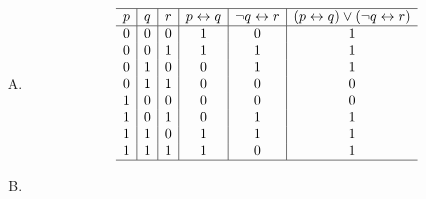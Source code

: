 {{\begin{practices}
\begin{enumerate}[A.]
{\begin{table}[H]
\[\begin{array}{c|c|c|c|c|c}
                                0 & 1 & 0 & 1 & 0 & 0 \\
                                0 & 1 & 1 & 1 & 1 & 1 \\
                                1 & 0 & 0 & 0 & 1 & 0 \\
                                1 & 0 & 1 & 0 & 1 & 0 \\
                                1 & 1 & 0 & 1 & 1 & 1 \\
                                1 & 1 & 1 & 1 & 1 & 1 \\
                                \hline
                            \end{array}
                        \]
                    \end{table}
                }
                \item
                {
                    \begin{table}[H]
                        \[
                            \begin{array}{c|c|c|c|c|c}
                                \hline
                                p & q & r & p \leftrightarrow q & \neg q \leftrightarrow r & (p \leftrightarrow q) \vee (\neg q \leftrightarrow r) \\
                                \hline
                                0 & 0 & 0 & 1 & 0 & 1 \\
                                0 & 0 & 1 & 1 & 1 & 1 \\
                                0 & 1 & 0 & 0 & 1 & 1 \\
                                0 & 1 & 1 & 0 & 0 & 0 \\
                                1 & 0 & 0 & 0 & 0 & 0 \\
                                1 & 0 & 1 & 0 & 1 & 1 \\
                                1 & 1 & 0 & 1 & 1 & 1 \\
                                1 & 1 & 1 & 1 & 0 & 1 \\
                                \hline
                            \end{array}
                        \]
                    \end{table}
                }
                \item
                {
                    \begin{table}[H]
                        \[
                            \begin{array}{c|c|c|c|c|c}

\end{array}\]
\end{table}}
\end{enumerate}
\end{practices}}}
